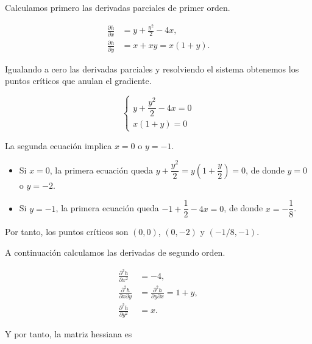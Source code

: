 \documentclass[
  spanish,
  a4paper,
]{scrreport}
\providecommand{\tightlist}{%
  \setlength{\itemsep}{0pt}\setlength{\parskip}{0pt}}
\theoremstyle{definition}
\theoremstyle{remark}
\begin{document}
\begin{tcolorbox}[enhanced jigsaw, arc=.35mm, bottomrule=.15mm, bottomtitle=1mm, breakable, colback=white, colbacktitle=quarto-callout-tip-color!10!white, colframe=quarto-callout-tip-color-frame, coltitle=black, left=2mm, leftrule=.75mm, opacityback=0, opacitybacktitle=0.6, rightrule=.15mm, title=\textcolor{quarto-callout-tip-color}{\faLightbulb}\hspace{0.5em}{Solución}, titlerule=0mm, toprule=.15mm, toptitle=1mm]

Calculamos primero las derivadas parciales de primer orden.

\[
\begin{aligned}
\frac{\partial h}{\partial x} &= y+\frac{y^2}{2}-4x,\\
\frac{\partial h}{\partial y} &= x+xy = x(1+y).
\end{aligned}
\]

Igualando a cero las derivadas parciales y resolviendo el sistema
obtenemos los puntos críticos que anulan el gradiente.

\[
\begin{cases}
y+\dfrac{y^2}{2}-4x=0\\[1ex]
x(1+y)=0
\end{cases}
\]

La segunda ecuación implica \(x=0\) o \(y=-1\).

\begin{itemize}
\tightlist
\item
  Si \(x=0\), la primera ecuación queda
  \(y+\dfrac{y^2}{2}=y\left(1+\dfrac{y}{2}\right)=0\), de donde \(y=0\)
  o \(y=-2\).
\item
  Si \(y=-1\), la primera ecuación queda \(-1+\dfrac{1}{2}-4x=0\), de
  donde \(x=-\dfrac{1}{8}\).
\end{itemize}

Por tanto, los puntos críticos son \((0,0)\), \((0,-2)\) y
\((-1/8,-1)\).

A continuación calculamos las derivadas de segundo orden.

\[
\begin{aligned}
\frac{\partial^2 h}{\partial x^2} &= -4,\\
\frac{\partial^2 h}{\partial x\partial y} &= \frac{\partial^2 h}{\partial y\partial x} = 1+y,\\
\frac{\partial^2 h}{\partial y^2} &= x.
\end{aligned}
\]

Y por tanto, la matriz hessiana es


\end{tcolorbox}
\end{document}
